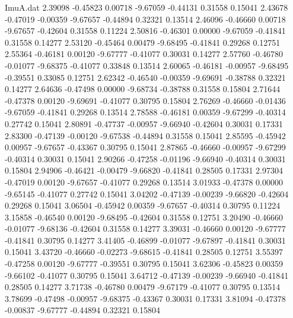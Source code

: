 \begin{filecontents}{ImuA.dat}
   2.39098   -0.45823    0.00718   -9.67059   -0.44131    0.31558    0.15041
   2.43678   -0.47019   -0.00359   -9.67657   -0.44894    0.32321    0.13514
   2.46096   -0.46660    0.00718   -9.67657   -0.42604    0.31558    0.11224
   2.50816   -0.46301    0.00000   -9.67059   -0.41841    0.31558    0.14277
   2.53120   -0.45464    0.00479   -9.68495   -0.41841    0.29268    0.12751
   2.55364   -0.46181    0.00120   -9.67777   -0.41077    0.30031    0.14277
   2.57760   -0.46780   -0.01077   -9.68375   -0.41077    0.33848    0.13514
   2.60065   -0.46181   -0.00957   -9.68495   -0.39551    0.33085    0.12751
   2.62342   -0.46540   -0.00359   -9.69691   -0.38788    0.32321    0.14277
   2.64636   -0.47498    0.00000   -9.68734   -0.38788    0.31558    0.15804
   2.71644   -0.47378    0.00120   -9.69691   -0.41077    0.30795    0.15804
   2.76269   -0.46660   -0.01436   -9.67059   -0.41841    0.29268    0.13514
   2.78588   -0.46181    0.00359   -9.67299   -0.40314    0.27742    0.15041
   2.80891   -0.47737   -0.00957   -9.66940   -0.42604    0.30031    0.17331
   2.83300   -0.47139   -0.00120   -9.67538   -0.44894    0.31558    0.15041
   2.85595   -0.45942    0.00957   -9.67657   -0.43367    0.30795    0.15041
   2.87865   -0.46660   -0.00957   -9.67299   -0.40314    0.30031    0.15041
   2.90266   -0.47258   -0.01196   -9.66940   -0.40314    0.30031    0.15804
   2.94906   -0.46421   -0.00479   -9.66820   -0.41841    0.28505    0.17331
   2.97304   -0.47019    0.00120   -9.67657   -0.41077    0.29268    0.13514
   3.01933   -0.47378    0.00000   -9.65145   -0.41077    0.27742    0.15041
   3.04202   -0.47139   -0.00239   -9.66820   -0.42604    0.29268    0.15041
   3.06504   -0.45942    0.00359   -9.67657   -0.40314    0.30795    0.11224
   3.15858   -0.46540    0.00120   -9.68495   -0.42604    0.31558    0.12751
   3.20490   -0.46660   -0.01077   -9.68136   -0.42604    0.31558    0.14277
   3.39031   -0.46660    0.00120   -9.67777   -0.41841    0.30795    0.14277
   3.41405   -0.46899   -0.01077   -9.67897   -0.41841    0.30031    0.15041
   3.43720   -0.46660   -0.02273   -9.68615   -0.41841    0.28505    0.12751
   3.55397   -0.47258    0.00120   -9.67777   -0.39551    0.30795    0.15041
   3.62306   -0.45823    0.00359   -9.66102   -0.41077    0.30795    0.15041
   3.64712   -0.47139   -0.00239   -9.66940   -0.41841    0.28505    0.14277
   3.71738   -0.46780    0.00479   -9.67179   -0.41077    0.30795    0.13514
   3.78699   -0.47498   -0.00957   -9.68375   -0.43367    0.30031    0.17331
   3.81094   -0.47378   -0.00837   -9.67777   -0.44894    0.32321    0.15804

\end{filecontents}
